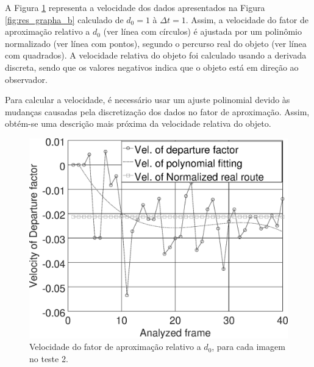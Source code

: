 A Figura \ref{fig:res_grapha_bv} representa a velocidade dos dados apresentados 
na Figura \ref{fig:res_grapha_b} calculado de $d_0=1$ à $\Delta t=1$.
Assim, a velocidade do fator de aproximação relativo a $d_0$ (ver línea com círculos) é ajustada por um polinômio
normalizado (ver línea com pontos), segundo o percurso real do objeto (ver línea com quadrados).
A velocidade relativa do objeto foi calculado usando a derivada
discreta, sendo que os valores negativos indica que o objeto está
em direção ao observador.

Para calcular a velocidade, é necessário usar um ajuste polinomial devido 
às mudanças causadas pela discretização dos dados no fator de aproximação.
Assim, obtém-se uma descrição mais próxima da velocidade relativa do 
objeto.

\begin{figure}[H]
\includegraphics[width=\columnwidth]{images/graphvelocity.eps}
\caption{Velocidade do fator de aproximação relativo a $d_0$, para cada imagem no teste 2.}
\label{fig:res_grapha_bv}
\end{figure}
